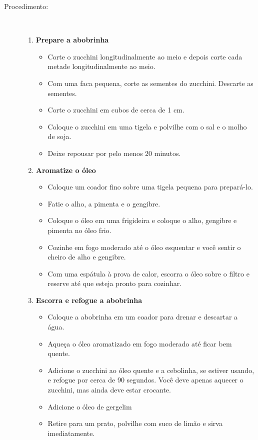 \documentclass[11pt,letterpaper]{article}
\newcommand \fileName {AsianZucchini}
\begin{document}
\begin {description}
\item [Procedimento:] \ \\
\begin {enumerate}
\item {\bf Prepare a abobrinha}
\begin {itemize}
\item Corte o zucchini longitudinalmente ao meio e depois corte cada metade longitudinalmente ao meio.
\item Com uma faca pequena, corte as sementes do zucchini. Descarte as sementes.
\item Corte o zucchini em cubos de cerca de 1 cm.
\item Coloque o zucchini em uma tigela e polvilhe com o sal e o molho de soja.
\item Deixe repousar por pelo menos 20 minutos.
\end {itemize}
\item {\bf Aromatize o óleo}
\begin {itemize}
        \item Coloque um coador fino sobre uma tigela pequena para prepará-lo.
\item Fatie o alho, a pimenta e o gengibre.
\item Coloque o óleo em uma frigideira e coloque o alho, gengibre e pimenta no óleo frio.
\item Cozinhe em fogo moderado até o óleo esquentar e você sentir o cheiro de alho e gengibre.
\item Com uma espátula à prova de calor, escorra o óleo sobre o filtro e reserve até que esteja pronto para cozinhar.
\end {itemize}
\item {\bf Escorra e refogue a abobrinha}
\begin {itemize}
\item Coloque a abobrinha em um coador para drenar e descartar a água.
\item Aqueça o óleo aromatizado em fogo moderado até ficar bem quente.
\item Adicione o zucchini ao óleo quente e a cebolinha, se estiver usando, e refogue por cerca de 90 segundos. Você deve apenas aquecer o zucchini, mas ainda deve estar crocante.
\item Adicione o óleo de gergelim
\item Retire para um prato, polvilhe com suco de limão e sirva imediatamente.
	\end{itemize}
	\end{enumerate}
\end{description}

\end{document}
